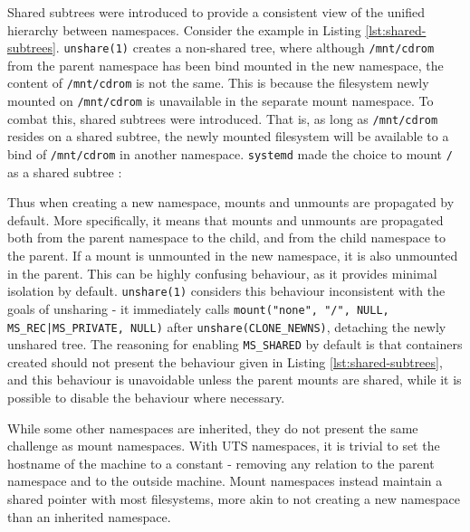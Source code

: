 \documentclass[12pt,a4paper,twoside]{report}
\begin{document}
Shared subtrees \citep{pai_shared_2005} were introduced to provide a consistent view of the unified hierarchy between namespaces. Consider the example in Listing \ref{lst:shared-subtrees}. \texttt{unshare(1)} creates a non-shared tree, where although \texttt{/mnt/cdrom} from the parent namespace has been bind mounted in the new namespace, the content of \texttt{/mnt/cdrom} is not the same. This is because the filesystem newly mounted on \texttt{/mnt/cdrom} is unavailable in the separate mount namespace. To combat this, shared subtrees were introduced. That is, as long as \texttt{/mnt/cdrom} resides on a shared subtree, the newly mounted filesystem will be available to a bind of \texttt{/mnt/cdrom} in another namespace. \texttt{systemd} made the choice to mount \texttt{/} as a shared subtree \citep{free_software_foundation_mount_namespaces7_2021}:


Thus when creating a new namespace, mounts and unmounts are propagated by default. More specifically, it means that mounts and unmounts are propagated both from the parent namespace to the child, and from the child namespace to the parent. If a mount is unmounted in the new namespace, it is also unmounted in the parent. This can be highly confusing behaviour, as it provides minimal isolation by default. \texttt{unshare(1)} considers this behaviour inconsistent with the goals of unsharing - it immediately calls \texttt{mount("none", "/", NULL, MS\_REC|MS\_PRIVATE, NULL)} after \texttt{unshare(CLONE\_NEWNS)}, detaching the newly unshared tree. The reasoning for enabling \texttt{MS\_SHARED} by default is that containers created should not present the behaviour given in Listing \ref{lst:shared-subtrees}, and this behaviour is unavoidable unless the parent mounts are shared, while it is possible to disable the behaviour where necessary.

While some other namespaces are inherited, they do not present the same challenge as mount namespaces. With UTS namespaces, it is trivial to set the hostname of the machine to a constant - removing any relation to the parent namespace and to the outside machine. Mount namespaces instead maintain a shared pointer with most filesystems, more akin to not creating a new namespace than an inherited namespace.
\end{document}
